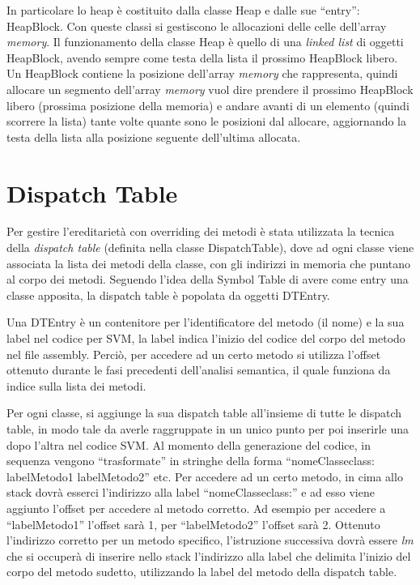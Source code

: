 \documentclass{scrreprt}
\begin{document}
In particolare lo heap è costituito dalla classe Heap e dalle sue ``entry'': HeapBlock. 
Con queste classi si gestiscono le allocazioni delle celle dell'array \textit{memory}. Il funzionamento
della classe Heap è quello di una \textit{linked list} di oggetti HeapBlock, avendo sempre come testa della lista il prossimo HeapBlock libero.
Un HeapBlock contiene la posizione dell'array \textit{memory} che rappresenta, quindi allocare un segmento dell'array \textit{memory} vuol dire
prendere il prossimo HeapBlock libero (prossima posizione della memoria) e andare avanti di un elemento (quindi scorrere la lista) tante volte quante sono le posizioni dal allocare, 
aggiornando la testa della lista alla posizione seguente dell'ultima allocata.

\section{Dispatch Table}

Per gestire l'ereditarietà con overriding dei metodi è stata utilizzata la tecnica della \textit{dispatch table} (definita nella classe DispatchTable), dove ad ogni classe viene associata la lista
dei metodi della classe, con gli indirizzi in memoria che puntano al corpo dei metodi. Seguendo l'idea della Symbol Table di avere come entry una classe apposita, la dispatch table è popolata da oggetti DTEntry.

Una DTEntry è un contenitore per l'identificatore del metodo (il nome) e la sua label nel codice per SVM, la label indica l'inizio del codice del corpo del metodo nel file assembly.
Perciò, per accedere ad un certo metodo si utilizza l'offset ottenuto durante le fasi precedenti dell'analisi semantica, il quale funziona
da indice sulla lista dei metodi.

Per ogni classe, si aggiunge la sua dispatch table all'insieme di tutte le dispatch table, in modo tale da averle raggruppate in un unico punto per poi
inserirle una dopo l'altra nel codice SVM. Al momento della generazione del codice, in sequenza vengono ``trasformate'' in stringhe della forma ``nomeClasse\textunderscore class: labelMetodo1 labelMetodo2'' etc.
Per accedere ad un certo metodo, in cima allo stack dovrà esserci l'indirizzo alla label ``nomeClasse\textunderscore class:'' e ad esso viene aggiunto l'offset per accedere al metodo corretto. Ad esempio per accedere a ``labelMetodo1'' l'offset sarà 1, per 
``labelMetodo2'' l'offset sarà 2. Ottenuto l'indirizzo corretto per un metodo specifico, l'istruzione successiva dovrà essere \textit{lm} che si occuperà di inserire nello stack l'indirizzo alla label che delimita l'inizio del corpo del metodo sudetto, utilizzando la label del metodo della dispatch table.
\end{document}
